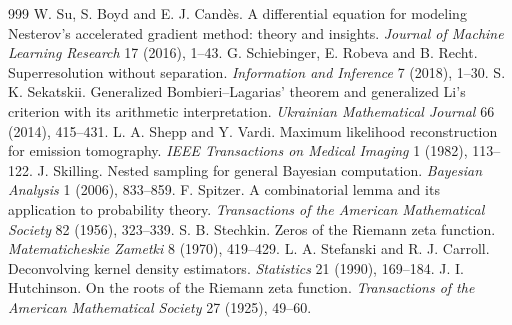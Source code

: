\begin{thebibliography}{999}
 W. Su, S. Boyd and E. J. Cand\`es. A differential equation for modeling Nesterov's accelerated gradient method: theory and insights. \emph{Journal of Machine Learning Research} 17 (2016), 1--43.
 G. Schiebinger, E. Robeva and B. Recht. Superresolution without separation. \emph{Information and Inference} 7 (2018), 1--30.
 S. K. Sekatskii. Generalized Bombieri--Lagarias' theorem and generalized Li's criterion with its arithmetic interpretation. \emph{Ukrainian Mathematical Journal} 66 (2014), 415--431.
 L. A. Shepp and Y. Vardi. Maximum likelihood reconstruction for emission tomography. \emph{IEEE Transactions on Medical Imaging} 1 (1982), 113--122.
 J. Skilling. Nested sampling for general Bayesian computation. \emph{Bayesian Analysis} 1 (2006), 833--859.
 F. Spitzer. A combinatorial lemma and its application to probability theory. \emph{Transactions of the American Mathematical Society} 82 (1956), 323--339.
 S. B. Stechkin. Zeros of the Riemann zeta function. \emph{Matematicheskie Zametki} 8 (1970), 419--429.
 L. A. Stefanski and R. J. Carroll. Deconvolving kernel density estimators. \emph{Statistics} 21 (1990), 169--184.
 J. I. Hutchinson. On the roots of the Riemann zeta function. \emph{Transactions of the American Mathematical Society} 27 (1925), 49--60.

\end{thebibliography}
